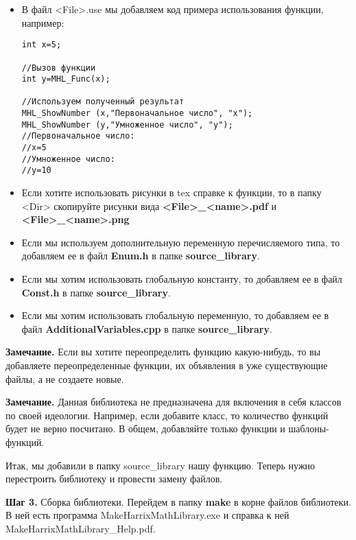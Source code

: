 \begin{itemize}
\begin{lstlisting}[label=examplefiletex, caption=Содержимое MHL\_Func.tex]
 x --- входной параметр.

\textbf{Возвращаемое значение:}
Число умноженное на 2.
\end{lstlisting}

\item В файл <File>.use мы добавляем код примера использования функции, например:
\begin{lstlisting}[label=examplefileuse, caption=Содержимое MHL\_Func.use]
int x=5;

//Вызов функции
int y=MHL_Func(x);

//Используем полученный результат
MHL_ShowNumber (x,"Первоначальное число", "x");
MHL_ShowNumber (y,"Умноженное число", "y");
//Первоначальное число:
//x=5
//Умноженное число:
//y=10
\end{lstlisting}

\item Если хотите использовать рисунки в tex справке к функции, то в папку <Dir> скопируйте рисунки вида  \textbf{<File>\_<name>.pdf} и \textbf{<File>\_<name>.png}

\item Если мы используем дополнительную переменную перечисляемого типа, то добавляем ее в файл \textbf{Enum.h} в папке \textbf{source\_library}.

\item Если мы хотим использовать глобальную константу, то добавляем ее в файл \textbf{Const.h} в папке \textbf{source\_library}.

\item Если мы хотим использовать глобальную переменную, то добавляем ее в файл \textbf{AdditionalVariables.cpp} в папке \textbf{source\_library}.

\end{itemize}

\textbf{Замечание.} Если вы хотите переопределить функцию какую-нибудь, то вы добавляете переопределенные функции, их объявления в уже существующие файлы, а не создаете новые.

\textbf{Замечание.} Данная библиотека не предназначена для включения в себя классов по своей идеологии. Например, если добавите класс, то количество функций будет не верно посчитано. В общем, добавляйте только функции и шаблоны-функций.

Итак, мы добавили в папку source\_library нашу функцию. Теперь нужно перестроить библиотеку и провести замену файлов.

\textbf{Шаг 3.}\label{step3} Сборка библиотеки. Перейдем в папку \textbf{make} в корне файлов библиотеки. В ней есть программа MakeHarrixMathLibrary.exe и справка к ней MakeHarrixMathLibrary\_Help.pdf. 

